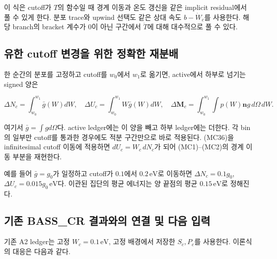 이 식은 cutoff가 \(T\)의 함수일 때 경계 이동과 온도 갱신을 같은 implicit residual에서 풀 수 있게 한다. 분포 trace와 upwind 선택도 같은 상대 속도 \(b-\dot W_c\)를 사용한다. 해당 branch의 bracket 계수가 0이 아닌 구간에서 \(\dot T\)에 대해 대수적으로 풀 수 있다.

\hypertarget{uxc720uxd55c-cutoff-uxbcc0uxacbduxc744-uxc704uxd55c-uxc815uxd655uxd55c-uxc7acuxbd84uxbc30}{%
\subsection{유한 cutoff 변경을 위한 정확한 재분배}\label{uxc720uxd55c-cutoff-uxbcc0uxacbduxc744-uxc704uxd55c-uxc815uxd655uxd55c-uxc7acuxbd84uxbc30}}

한 순간의 분포를 고정하고 cutoff를 \(w_0\)에서 \(w_1\)로 옮기면, active에서 하부로 넘기는 signed 양은

\[
\Delta N_c=\int_{w_0}^{w_1}\bar g(W)dW,\quad
\Delta U_c=\int_{w_0}^{w_1}W\bar g(W)dW,
\quad
\Delta\boldsymbol M_c=\int_{w_0}^{w_1}\!\int p(W)\boldsymbol n g\,d\Omega\,dW.
\tag{MC36}
\]

여기서 \(\bar g=\int gd\Omega\)다. active ledger에는 이 양을 빼고 하부 ledger에는 더한다. 각 bin의 일부만 cutoff를 통과한 경우에도 적분 구간만으로 바로 적용된다. (MC36)을 infinitesimal cutoff 이동에 적용하면 \(dU_c=W_c\,dN_c\)가 되어 (MC1)--(MC2)의 경계 이동 부분을 재현한다.

예를 들어 \(\bar g=g_0\)가 일정하고 cutoff가 \(0.1\)에서 \(0.2\,\mathrm{eV}\)로 이동하면 \(\Delta N_c=0.1g_0\), \(\Delta U_c=0.015g_0\,\mathrm{eV}\)다. 이관된 집단의 평균 에너지는 양 끝점의 평균 \(0.15\,\mathrm{eV}\)로 정해진다.

\hypertarget{uxae30uxc874-bass_cr-uxacb0uxacfcuxc640uxc758-uxc5f0uxacb0-uxbc0f-uxb2e4uxc74c-uxc785uxb825}{%
\subsection{기존 BASS\_CR 결과와의 연결 및 다음 입력}\label{uxae30uxc874-bass_cr-uxacb0uxacfcuxc640uxc758-uxc5f0uxacb0-uxbc0f-uxb2e4uxc74c-uxc785uxb825}}

기존 A2 ledger는 고정 \(W_c=0.1\,\mathrm{eV}\), 고정 배경에서 저장한 \(S_c,P_c\)를 사용한다. 이론식의 대응은 다음과 같다.

